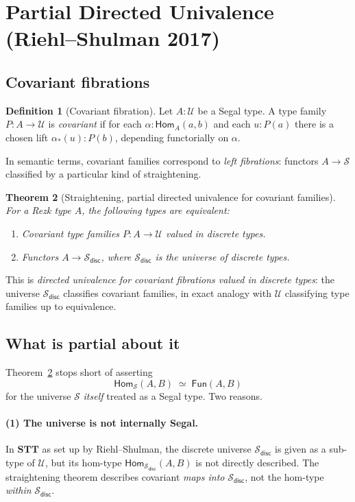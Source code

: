 \documentclass[12pt]{article}
\newtheorem{theorem}{Theorem}[section]
\theoremstyle{definition}
\newtheorem{definition}[theorem]{Definition}
\theoremstyle{remark}
\newcommand{\U}{\mathcal{U}}
\newcommand{\Hom}{\mathsf{Hom}}
\newcommand{\Fun}{\mathsf{Fun}}
\newcommand{\eqv}{\simeq}
\newcommand{\disc}{\mathsf{disc}}
\newcommand{\STT}{\mathbf{STT}}
\begin{document}
\section{Partial Directed Univalence (Riehl--Shulman 2017)}\label{sec:partial}

\subsection{Covariant fibrations}

\begin{definition}[Covariant fibration]\label{def:covariant}
Let $A : \U$ be a Segal type. A type family $P : A \to \U$ is \emph{covariant} if for each $\alpha : \Hom_A(a,b)$ and each $u : P(a)$ there is a chosen lift $\alpha_*(u) : P(b)$, depending functorially on $\alpha$.
\end{definition}

In semantic terms, covariant families correspond to \emph{left fibrations}: functors $A \to \mathcal{S}$ classified by a particular kind of straightening.

\begin{theorem}[Straightening, partial directed univalence for covariant families]\label{thm:straightening}
For a Rezk type $A$, the following types are equivalent:
\begin{enumerate}
\item Covariant type families $P : A \to \U$ valued in discrete types.
\item Functors $A \to \mathcal{S}_{\disc}$, where $\mathcal{S}_{\disc}$ is the universe of discrete types.
\end{enumerate}
\end{theorem}

This is \emph{directed univalence for covariant fibrations valued in discrete types}: the universe $\mathcal{S}_{\disc}$ classifies covariant families, in exact analogy with $\U$ classifying type families up to equivalence.

\subsection{What is partial about it}

Theorem~\ref{thm:straightening} stops short of asserting
\[
\Hom_{\mathcal{S}}(A, B) \;\eqv\; \Fun(A, B)
\]
for the universe $\mathcal{S}$ \emph{itself} treated as a Segal type. Two reasons.

\paragraph{(1) The universe is not internally Segal.}
In $\STT$ as set up by Riehl--Shulman, the discrete universe $\mathcal{S}_{\disc}$ is given as a sub-type of $\U$, but its hom-type $\Hom_{\mathcal{S}_{\disc}}(A,B)$ is not directly described. The straightening theorem describes covariant \emph{maps into} $\mathcal{S}_{\disc}$, not the hom-type \emph{within} $\mathcal{S}_{\disc}$.
\end{document}
